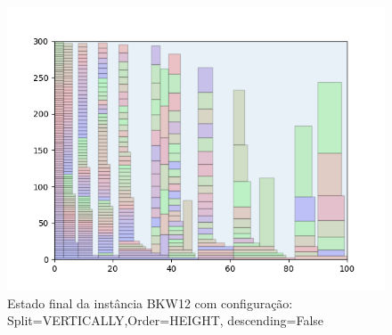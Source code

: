 \begin{figure}[H]
    \centering
    \caption[]{Estado final da instância BKW12 com configuração: Split=VERTICALLY,Order=HEIGHT, descending=False}
    \label{fig:bkw12-vertically-height-false}
    \includegraphics[scale=0.5]{output/figures/bkw/bkw12/vertically/height/false/000}
\end{figure}